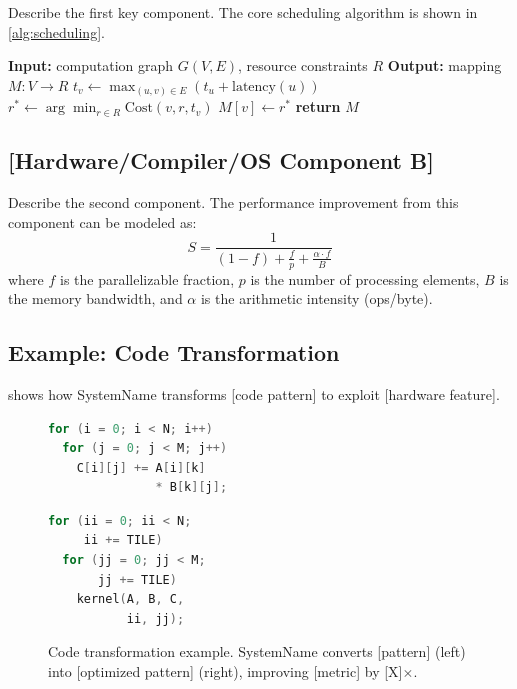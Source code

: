 \documentclass[sigplan,10pt]{acmart}
\newcommand{\system}{SystemName\xspace}
\begin{document}
Describe the first key component. The core scheduling algorithm is
shown in \cref{alg:scheduling}.

\begin{algorithm}[t]
  \caption{[Algorithm name] in \system}
  \label{alg:scheduling}
  \begin{algorithmic}[1]
    \STATE \textbf{Input:} computation graph $G(V, E)$, resource constraints $R$
    \STATE \textbf{Output:} mapping $M: V \rightarrow R$
      \STATE $t_v \leftarrow \max_{(u,v) \in E} (t_u + \text{latency}(u))$
      \STATE $r^* \leftarrow \arg\min_{r \in R} \text{Cost}(v, r, t_v)$
      \STATE $M[v] \leftarrow r^*$
    \ENDFOR
    \STATE \textbf{return} $M$
  \end{algorithmic}
\end{algorithm}

\subsection{[Hardware/Compiler/OS Component B]}

Describe the second component. The performance improvement
from this component can be modeled as:
\begin{equation}
  \label{eq:speedup}
  S = \frac{1}{(1-f) + \frac{f}{p} + \frac{\alpha \cdot f}{B}}
\end{equation}
where $f$ is the parallelizable fraction, $p$ is the number of
processing elements, $B$ is the memory bandwidth, and $\alpha$
is the arithmetic intensity (ops/byte).

\subsection{Example: Code Transformation}

 shows how \system transforms [code pattern]
to exploit [hardware feature].

\begin{figure}[t]
  \centering
  \begin{minipage}[t]{0.48\columnwidth}
    \centering
    \begin{lstlisting}[title=\textbf{Before},language=C]
for (i = 0; i < N; i++)
  for (j = 0; j < M; j++)
    C[i][j] += A[i][k]
               * B[k][j];
    \end{lstlisting}
  \end{minipage}
  \hfill
  \begin{minipage}[t]{0.48\columnwidth}
    \centering
    \begin{lstlisting}[title=\textbf{After (\system)},language=C]
for (ii = 0; ii < N;
     ii += TILE)
  for (jj = 0; jj < M;
       jj += TILE)
    kernel(A, B, C,
           ii, jj);
    \end{lstlisting}
  \end{minipage}
  \caption{Code transformation example. \system converts [pattern]
    (left) into [optimized pattern] (right), improving [metric]
    by [X]$\times$.}
  \label{fig:transform}
\end{figure}
\end{document}
